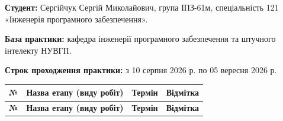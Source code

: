 
\noindent\textbf{Студент:} Сергійчук Сергій Миколайович, група ІПЗ-61м, спеціальність 121 «Інженерія програмного забезпечення».

\noindent\textbf{База практики:} кафедра інженерії програмного забезпечення та штучного інтелекту НУВГП.

\noindent\textbf{Строк проходження практики:} з 10 серпня 2026 р. по 05 вересня 2026 р.

\vspace{1em}
\begin{spacing}{1.0}
\small\noindent
\renewcommand{\arraystretch}{1.35}
\setlength{\tabcolsep}{6pt}
\begin{xltabular}{\textwidth}{| c | >{\raggedright\arraybackslash}X | >{\centering\arraybackslash}p{2.5cm} | >{\centering\arraybackslash}p{2.3cm} |}
    \hline
    \textbf{№} & \textbf{Назва етапу (виду робіт)} & \textbf{Термін} & \textbf{Відмітка} \\ \hline
    \endfirsthead

    \hline
    \textbf{№} & \textbf{Назва етапу (виду робіт)} & \textbf{Термін} & \textbf{Відмітка} \\ \hline
    \endhead


\end{xltabular}
\end{spacing}
